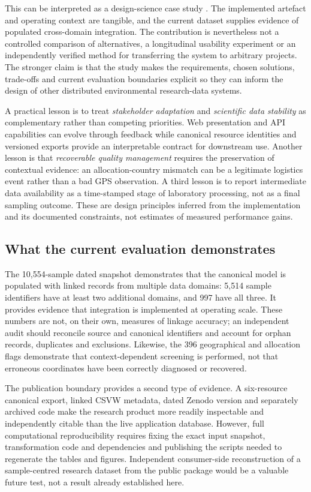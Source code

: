\documentclass[11pt,a4paper]{article}
\begin{document}
This can be interpreted as a design-science case study \parencite{hevner2004design,peffers2007dsrm}. The implemented artefact and operating context are tangible, and the current dataset supplies evidence of populated cross-domain integration. The contribution is nevertheless not a controlled comparison of alternatives, a longitudinal usability experiment or an independently verified method for transferring the system to arbitrary projects. The stronger claim is that the study makes the requirements, chosen solutions, trade-offs and current evaluation boundaries explicit so they can inform the design of other distributed environmental research-data systems.

A practical lesson is to treat \emph{stakeholder adaptation} and \emph{scientific data stability} as complementary rather than competing priorities. Web presentation and API capabilities can evolve through feedback while canonical resource identities and versioned exports provide an interpretable contract for downstream use. Another lesson is that \emph{recoverable quality management} requires the preservation of contextual evidence: an allocation-country mismatch can be a legitimate logistics event rather than a bad GPS observation. A third lesson is to report intermediate data availability as a time-stamped stage of laboratory processing, not as a final sampling outcome. These are design principles inferred from the implementation and its documented constraints, not estimates of measured performance gains.

\subsection{What the current evaluation demonstrates}
The 10,554-sample dated snapshot demonstrates that the canonical model is populated with linked records from multiple data domains: 5,514 sample identifiers have at least two additional domains, and 997 have all three. It provides evidence that integration is implemented at operating scale. These numbers are not, on their own, measures of linkage accuracy; an independent audit should reconcile source and canonical identifiers and account for orphan records, duplicates and exclusions. Likewise, the 396 geographical and allocation flags demonstrate that context-dependent screening is performed, not that erroneous coordinates have been correctly diagnosed or recovered.

The publication boundary provides a second type of evidence. A six-resource canonical export, linked CSVW metadata, dated Zenodo version and separately archived code make the research product more readily inspectable and independently citable than the live application database. However, full computational reproducibility requires fixing the exact input snapshot, transformation code and dependencies and publishing the scripts needed to regenerate the tables and figures. Independent consumer-side reconstruction of a sample-centred research dataset from the public package would be a valuable future test, not a result already established here.
\end{document}
